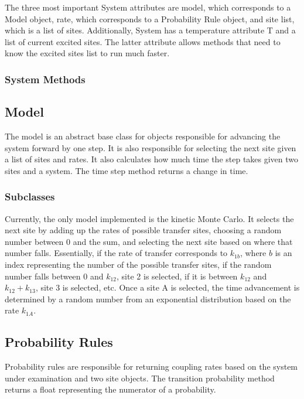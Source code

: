 \documentclass{article}
\begin{document}
The three most important System attributes are model, which corresponds to a Model object, rate, which corresponds to a Probability Rule object, and site list, which is a list of sites. Additionally, System has a temperature attribute T and a list of current excited sites. The latter attribute allows methods that need to know the excited sites list to run much faster.

\subsubsection{System Methods}



\subsection{Model}

The model is an abstract base class for objects responsible for advancing the system forward by one step. It is also responsible for selecting the next site given a list of sites and rates. It also calculates how much time the step takes given two sites and a system. The time step method returns a change in time.

\subsubsection{Subclasses}

Currently, the only model implemented is the kinetic Monte Carlo. It selects the next site by adding up the rates of possible transfer sites, choosing a random number between 0 and the sum, and selecting the next site based on where that number falls. Essentially, if the rate of transfer corresponds to $k_{1b}$, where $b$ is an index representing the number of the possible transfer sites, if the random number falls between 0 and $k_{12}$, site 2 is selected, if it is between $k_{12}$ and $k_{12}+k_{13}$, site 3 is selected, etc. Once a site A is selected, the time advancement is determined by a random number from an exponential distribution based on the rate $k_{1A}$.

\subsection{Probability Rules}

Probability rules are responsible for returning coupling rates based on the system under examination and two site objects. The transition probability method returns a float representing the numerator of a probability. 
\end{document}
